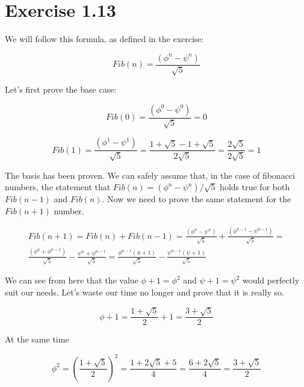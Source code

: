 \section{Exercise 1.13}


	We will follow this formula, as defined in the exercise:

	\begin{equation}
		\label{fibonacci_approximation}
		Fib(n) = {\frac {\left(\phi^n-\psi^n \right)} {\sqrt5}}
	\end {equation}

	Let's first prove the base case:

	\begin{equation}
		Fib(0) = {\frac {\left(\phi^0-\psi^0 \right)} {\sqrt5}} = 0
	\end{equation}

	\begin{equation}
		Fib(1) = {\frac {\left(\phi^1-\psi^1 \right)} {\sqrt5}} = \frac {1 + \sqrt5 - 1 + \sqrt5} {2\sqrt5} = \frac {2\sqrt5} {2\sqrt5} = 1
	\end{equation}

The basis has been proven. We can safely assume that, in the case of fibonacci numbers, the statement that $Fib(n) = \left(\phi^n-\psi^n\right)/\sqrt5$ holds true for both $Fib(n-1)$ and $Fib(n)$. Now we need to prove the same statement for the $Fib(n+1)$ number.

\begin{multline}
	Fib(n+1) = Fib(n) + Fib(n-1) = \frac {\left(\phi^n-\psi^n\right)} {\sqrt5} + \frac {\left(\phi^{n-1}-\psi^{n-1}\right)} {\sqrt5} = \\
	\frac {\left(\phi^n+\phi^{n-1}\right)} {\sqrt5} - \frac {\psi^n+\psi^{n-1}} {\sqrt5} = \frac {\phi^{n-1}\left(\phi+1\right)} {\sqrt5} - \frac {\psi^{n-1}\left(\psi+1\right)} {\sqrt5}
\end{multline}

We can see from here that the value $\phi+1=\phi^2$ and $\psi+1=\psi^2$ would perfectly suit our needs. Let's waste our time no longer and prove that it is really so.

\begin{equation}
	\phi+1 = \frac {1 + \sqrt5} {2} + 1 = \frac {3 + \sqrt5} {2}
\end{equation}

At the same time

\begin{equation}
	\phi^2 = \left(\frac {1 + \sqrt5} {2}\right)^2 = \frac {1 + 2\sqrt5 + 5} {4} = \frac {6 + 2\sqrt5} {4} = \frac {3 + \sqrt5} {2}
\end{equation}

